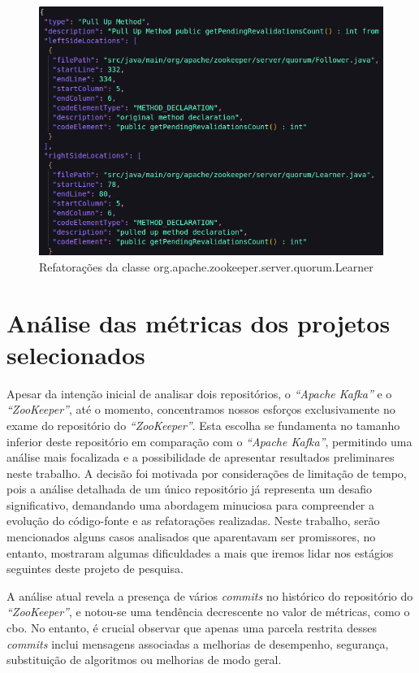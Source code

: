 \begin{figure}[h]
    \centering
    \includegraphics[width=0.8\linewidth]{figuras/Output/RefactoringMiner/org.apache.zookeeper.server.quorum.Learner.png}
    \caption{Refatorações da classe org.apache.zookeeper.server.quorum.Learner}
    \label{fig:RefactoringMinerOutput}
\end{figure}

\section{Análise das métricas dos projetos selecionados}
Apesar da intenção inicial de analisar dois repositórios, o \textit{``Apache Kafka''} e o \textit{``ZooKeeper''}, até o momento, concentramos nossos esforços exclusivamente no exame do repositório do \textit{``ZooKeeper''}. Esta escolha se fundamenta no tamanho inferior deste repositório em comparação com o \textit{``Apache Kafka''}, permitindo uma análise mais focalizada e a possibilidade de apresentar resultados preliminares neste trabalho. A decisão foi motivada por considerações de limitação de tempo, pois a análise detalhada de um único repositório já representa um desafio significativo, demandando uma abordagem minuciosa para compreender a evolução do código-fonte e as refatorações realizadas.  Neste trabalho, serão mencionados alguns casos analisados que aparentavam ser promissores, no entanto, mostraram algumas dificuldades a mais que iremos lidar nos estágios seguintes deste projeto de pesquisa.

A análise atual revela a presença de vários \textit{commits} no histórico do repositório do \textit{``ZooKeeper''}, e notou-se uma tendência decrescente no valor de métricas, como o \gls{cbo}. No entanto, é crucial observar que apenas uma parcela restrita desses \textit{commits} inclui mensagens associadas a melhorias de desempenho, segurança, substituição de algoritmos ou melhorias de modo geral. 

